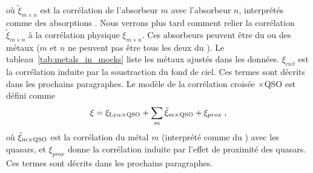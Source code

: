 où $\tilde \xi_{m \times n}$ est la corrélation de l'absorbeur $m$ avec l'absorbeur $n$, interprétés comme des absorptions \lya{}.
  Nous verrons plus tard comment relier la  corrélation $\tilde \xi_{m \times n}$ à la corrélation physique $\xi_{m \times n}$.
  Ces absorbeurs peuvent être du \lya{} ou des métaux ($m$ et $n$ ne peuvent pas être tous les deux du \lya{}). Le tableau~\ref{tab:metals_in_mocks} liste les métaux ajustés dans les données. $\xi_{ciel}$ est la corrélation induite par la soustraction du fond de ciel. Ces termes sont décrits dans les prochains paragraphes.
Le modèle de la corrélation croisée \lya{}$\times$QSO est défini comme
\begin{equation}
  \label{eq:xcf_model1}
  \xi = \xi_{\mathrm{Ly}\alpha\times \textsc{QSO}} + \sum_{m} \tilde \xi_{m \times \textsc{QSO}} + \xi_{prox} \; ,
\end{equation}
où $\tilde \xi_{m \times \textsc{QSO}}$ est la corrélation du métal $m$ (interprété comme du \lya{}) avec les quasars, et $\xi_{prox}$ donne la corrélation induite par l'effet de proximité des quasars. Ces termes sont décrits dans les prochains paragraphes.

